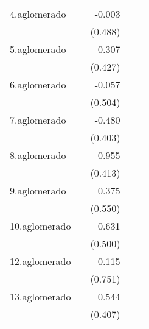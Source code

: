 {\begin{longtable}{l*{4}{D{.}{.}{-1}}}
\addlinespace
4.aglomerado&                     &      -0.003         &                     &                     \\
            &                     &     (0.488)         &                     &                     \\
\addlinespace
5.aglomerado&                     &      -0.307         &                     &                     \\
            &                     &     (0.427)         &                     &                     \\
\addlinespace
6.aglomerado&                     &      -0.057         &                     &                     \\
            &                     &     (0.504)         &                     &                     \\
\addlinespace
7.aglomerado&                     &      -0.480         &                     &                     \\
            &                     &     (0.403)         &                     &                     \\
\addlinespace
8.aglomerado&                     &      -0.955\sym{*}  &                     &                     \\
            &                     &     (0.413)         &                     &                     \\
\addlinespace
9.aglomerado&                     &       0.375         &                     &                     \\
            &                     &     (0.550)         &                     &                     \\
\addlinespace
10.aglomerado&                     &       0.631         &                     &                     \\
            &                     &     (0.500)         &                     &                     \\
\addlinespace
12.aglomerado&                     &       0.115         &                     &                     \\
            &                     &     (0.751)         &                     &                     \\
\addlinespace
13.aglomerado&                     &       0.544         &                     &                     \\
            &                     &     (0.407)         &                     &                     \\

\end{longtable}}
